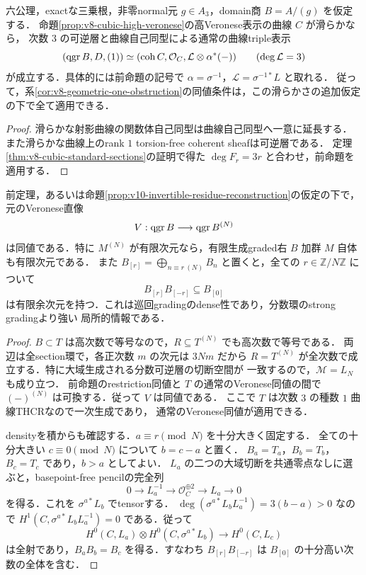 \documentclass[11pt,a4paper]{ltjsarticle}
\begin{document}
\begin{theorem}[滑らかな高Veroneseによる元の境界heartの復元]
\label{thm:v10-smooth-veronese-heart}
六公理，exactな三乗根，非零normal元 $g\in A_3$，domain商 $B=A/(g)$ を仮定する．
命題\ref{prop:v8-cubic-high-veronese}の高Veronese表示の曲線 $C$ が滑らかなら，
次数 $3$ の可逆層と曲線自己同型による通常の曲線triple表示
\[
 (\operatorname{qgr} B,D,(1))\simeq
 (\operatorname{coh} C,\mathcal O_C,\mathcal L\otimes\alpha^*(-))
 \qquad(\deg\mathcal L=3)
\]
が成立する．具体的には前命題の記号で
$\alpha=\sigma^{-1}$，$\mathcal L=\sigma^{-1*}L$ と取れる．
従って，系\ref{cor:v8-geometric-one-obstruction}の同値条件は，この滑らかさの追加仮定の下で全て適用できる．
\end{theorem}
\begin{proof}
滑らかな射影曲線の関数体自己同型は曲線自己同型へ一意に延長する．
また滑らかな曲線上のrank $1$ torsion-free coherent sheafは可逆層である．
定理\ref{thm:v8-cubic-standard-sections}の証明で得た
$\deg F_r=3r$ と合わせ，前命題を適用する．
\end{proof}

\begin{corollary}[Veroneseの核の消滅と有限巡回gradingのdensity]
\label{cor:v10-smooth-veronese-dense}
前定理，あるいは命題\ref{prop:v10-invertible-residue-reconstruction}の仮定の下で，
元のVeronese直像
\[
 V:\operatorname{qgr} B\longrightarrow\operatorname{qgr} B^{(N)}
\]
は同値である．特に $M^{(N)}$ が有限次元なら，有限生成graded右 $B$ 加群 $M$ 自体も有限次元である．
また $B_{[r]}=\bigoplus_{n\equiv r\ (N)}B_n$ と置くと，全ての $r\in\mathbb Z/N\mathbb Z$ について
\[
 B_{[r]}B_{[-r]}\subseteq B_{[0]}
\]
は有限余次元を持つ．これは巡回gradingのdense性であり，分数環のstrong gradingより強い
局所的情報である．
\end{corollary}
\begin{proof}
$B\subset T$ は高次数で等号なので，$R\subseteq T^{(N)}$ でも高次数で等号である．
両辺は全section環で，各正次数 $m$ の次元は $3Nm$ だから
$R=T^{(N)}$ が全次数で成立する．特に大域生成される分数可逆層の切断空間が
一致するので，$\mathcal M=L_N$ も成り立つ．
前命題のrestriction同値と $T$ の通常のVeronese同値の間で
$(-)^{(N)}$ は可換する．従って $V$ は同値である．
ここで $T$ は次数 $3$ の種数 $1$ 曲線THCRなので一次生成であり，
通常のVeronese同値が適用できる．

densityを積からも確認する．$a\equiv r\pmod N$ を十分大きく固定する．
全ての十分大きい $c\equiv0\pmod N$ について $b=c-a$ と置く．
$B_a=T_a$，$B_b=T_b$，$B_c=T_c$ であり，$b>a$ としてよい．
$L_a$ の二つの大域切断を共通零点なしに選ぶと，basepoint-free pencilの完全列
\[
 0\longrightarrow L_a^{-1}\longrightarrow\mathcal O_C^{\oplus2}
 \longrightarrow L_a\longrightarrow0
\]
を得る．これを $\sigma^{a*}L_b$ でtensorする．
$\deg(\sigma^{a*}L_b L_a^{-1})=3(b-a)>0$ なので
$H^1(C,\sigma^{a*}L_b L_a^{-1})=0$ である．従って
\[
 H^0(C,L_a)\otimes H^0(C,\sigma^{a*}L_b)
 \longrightarrow H^0(C,L_c)
\]
は全射であり，$B_aB_b=B_c$ を得る．すなわち
$B_{[r]}B_{[-r]}$ は $B_{[0]}$ の十分高い次数の全体を含む．
\end{proof}
\end{document}
